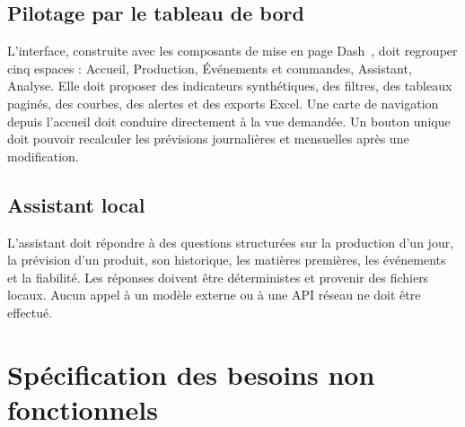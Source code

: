 \subsection{Pilotage par le tableau de bord}

L'interface, construite avec les composants de mise en page Dash~\cite{dashDocs},
doit regrouper cinq espaces : Accueil, Production, Événements et
commandes, Assistant, Analyse. Elle doit proposer des indicateurs synthétiques,
des filtres, des tableaux paginés, des courbes, des alertes et des exports Excel.
Une carte de navigation depuis l'accueil doit conduire directement à la vue
demandée. Un bouton unique doit pouvoir recalculer les prévisions journalières et
mensuelles après une modification.

\subsection{Assistant local}

L'assistant doit répondre à des questions structurées sur la production d'un
jour, la prévision d'un produit, son historique, les matières premières, les
événements et la fiabilité. Les réponses doivent être déterministes et provenir
des fichiers locaux. Aucun appel à un modèle externe ou à une API réseau ne doit
être effectué.

\section{Spécification des besoins non fonctionnels}


